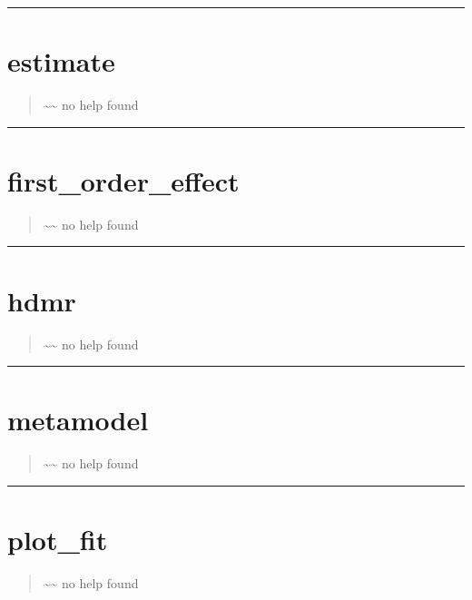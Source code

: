 \documentclass[letterpaper,10pt,english]{sphinxmanual}
\begin{document}
\bigskip\hrule{}\bigskip



\section{estimate}
\label{classes/utils/@hdmr/hdmr:estimate}\label{classes/utils/@hdmr/hdmr:id1}\begin{quote}

\textasciitilde{}\textasciitilde{} no help found
\end{quote}


\bigskip\hrule{}\bigskip



\section{first\_order\_effect}
\label{classes/utils/@hdmr/hdmr:id2}\label{classes/utils/@hdmr/hdmr:first-order-effect}\begin{quote}

\textasciitilde{}\textasciitilde{} no help found
\end{quote}


\bigskip\hrule{}\bigskip



\section{hdmr}
\label{classes/utils/@hdmr/hdmr:hdmr}\label{classes/utils/@hdmr/hdmr:id3}\begin{quote}

\textasciitilde{}\textasciitilde{} no help found
\end{quote}


\bigskip\hrule{}\bigskip



\section{metamodel}
\label{classes/utils/@hdmr/hdmr:id4}\label{classes/utils/@hdmr/hdmr:metamodel}\begin{quote}

\textasciitilde{}\textasciitilde{} no help found
\end{quote}


\bigskip\hrule{}\bigskip



\section{plot\_fit}
\label{classes/utils/@hdmr/hdmr:id5}\label{classes/utils/@hdmr/hdmr:plot-fit}\begin{quote}

\textasciitilde{}\textasciitilde{} no help found
\end{quote}
\end{document}
